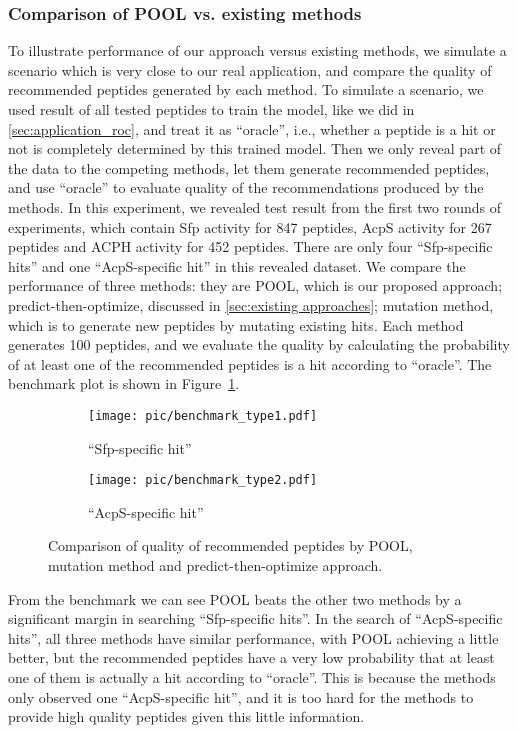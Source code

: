 \subsubsection{Comparison of POOL vs. existing methods}
To illustrate performance of our approach versus existing methods, we simulate a scenario which is very close to our real application, and compare the quality of recommended peptides generated by each method. To simulate a scenario, we used result of all tested peptides to train the model, like we did in \ref{sec:application_roc}, and treat it as \enquote{oracle}, i.e., whether a peptide is a hit or not is completely determined by this trained model. Then we only reveal part of the data to the competing methods, let them generate recommended peptides, and use \enquote{oracle} to evaluate quality of the recommendations produced by the methods. In this experiment, we revealed test result from the first two rounds of experiments, which contain Sfp activity for 847 peptides, AcpS activity for 267 peptides and ACPH activity for 452 peptides. There are only four \enquote{Sfp-specific hits} and one \enquote{AcpS-specific hit} in this revealed dataset. We compare the performance of three methods: they are POOL, which is our proposed approach; predict-then-optimize, discussed in \ref{sec:existing approaches}; mutation method, which is to generate new peptides by mutating existing hits. Each method generates 100 peptides, and we evaluate the quality by calculating the probability of at least one of the recommended peptides is a hit according to \enquote{oracle}. The benchmark plot is shown in Figure~\ref{fig:benchmark}.
\begin{figure}[hpt] 
\center
\begin{subfigure}[b]{0.46\linewidth}
\texttt{[image: pic/benchmark\_type1.pdf]}
\caption{\enquote{Sfp-specific hit}}
\end{subfigure}
\begin{subfigure}[b]{0.46\linewidth}
\texttt{[image: pic/benchmark\_type2.pdf]}
\caption{\enquote{AcpS-specific hit}}
\end{subfigure}
\caption{Comparison of quality of recommended peptides by POOL, mutation method and predict-then-optimize approach.}
\label{fig:benchmark}
\end{figure}

From the benchmark we can see POOL beats the other two methods by a significant margin in searching \enquote{Sfp-specific hits}. In the search of \enquote{AcpS-specific hits}, all three methods have similar performance, with POOL achieving a little better, but the recommended peptides have a very low probability that at least one of them is actually a hit according to \enquote{oracle}. This is because the methods only observed one \enquote{AcpS-specific hit}, and it is too hard for the methods to provide high quality peptides given this little information. 